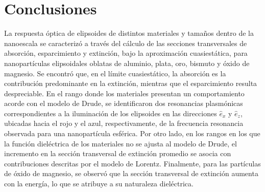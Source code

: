 \section{Conclusiones}
La respuesta óptica de elipsoides de distintos materiales y tamaños dentro de la nanoescala se caracterizó a través del cálculo de las secciones transversales de absorción, esparcimiento y extinción, bajo la aproximación cuasiestática, para nanopartículas elipsoidales oblatas de aluminio, plata, oro, bismuto y óxido de magnesio. Se encontró que, en el límite cuasiestático, la absorción es la contribución predominante en la extinción, mientras que el esparcimiento resulta despreciable. En el rango donde los materiales presentan un comportamiento acorde con el modelo de Drude, se identificaron dos resonancias plasmónicas correspondientes a la iluminación de los elipsoides en las direcciones $\hat{e}_x$ y $\hat{e}_z$, ubicadas hacia el rojo y el azul, respectivamente, de la frecuencia resonancia observada para una nanopartícula esférica. Por otro lado, en los rangos en los que la función dieléctrica de los materiales no se ajusta al modelo de Drude, el incremento en la sección transversal de extinción promedio se asocia con contribuciones descritas por el modelo de Lorentz. Finalmente, para las partículas de óxido de magnesio, se observó que la sección transversal de extinción aumenta con la energía, lo que se atribuye a su naturaleza dieléctrica.
